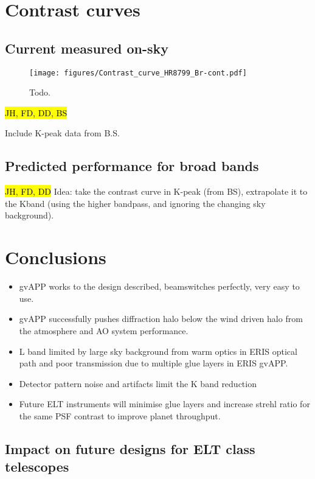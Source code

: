 \documentclass{aa}
\begin{document}
\section{Contrast curves}

\subsection{Current measured on-sky}
\begin{figure}
    \centering
    \texttt{[image: figures/Contrast\_curve\_HR8799\_Br-cont.pdf]}
    \caption{Todo.}
    \label{fig:lprime_cc}
\end{figure}

\hl{JH, FD, DD, BS}

Include K-peak data from B.S.

\subsection{Predicted performance for broad bands}
\hl{JH, FD, DD}
Idea: take the contrast curve in K-peak (from BS), extrapolate it to the Kband (using the higher bandpass, and ignoring the changing sky background).

\section{Conclusions}\label{sec:conclusion}


\begin{itemize}
    \item gvAPP works to the design described, beamswitches perfectly, very easy to use.
    \item gvAPP successfully pushes diffraction halo below the wind driven halo from the atmosphere and AO system performance.
    \item L band limited by large sky background from warm optics in ERIS optical path and poor transmission due to multiple glue layers in ERIS gvAPP.
    \item Detector pattern noise and artifacts limit the K band reduction
    \item Future ELT instruments will minimise glue layers and increase strehl ratio for the same PSF contrast to improve planet throughput.
\end{itemize}

\subsection{Impact on future designs for ELT class telescopes}
\end{document}
